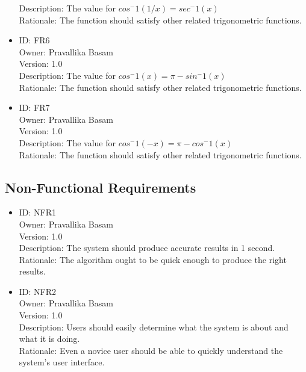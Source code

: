 \documentclass{article}
\begin{document}
\begin{itemize}
        Description: The value for $cos^-1(1/x)= sec^-1(x)$\\
        Rationale: The function should satisfy other related trigonometric functions.\\
        \item ID: FR6\\
        Owner: Pravallika Basam\\
        Version: 1.0\\
        Description: The value for $cos^-1(x)= \pi- sin^-1(x) $\\
        Rationale: The function should satisfy other related trigonometric functions.\\
        \item ID: FR7\\
        Owner: Pravallika Basam\\
        Version: 1.0\\
        Description: The value for $cos^-1(-x)= \pi- cos^-1(x) $\\
        Rationale: The function should satisfy other related trigonometric functions.
    \end{itemize}

    \subsection{Non-Functional Requirements}
    \begin{itemize}
        \item ID: NFR1\\
        Owner: Pravallika Basam\\
        Version: 1.0\\
        Description: The system should produce accurate results in 1 second.\\
        Rationale: The algorithm ought to be quick enough to produce the right results.\\
        \item ID: NFR2\\
        Owner: Pravallika Basam\\
        Version: 1.0\\
        Description: Users should easily determine what the system is about and what it is doing.\\
        Rationale: Even a novice user should be able to quickly understand the system's user interface.\\
    \end{itemize}
\end{document}
